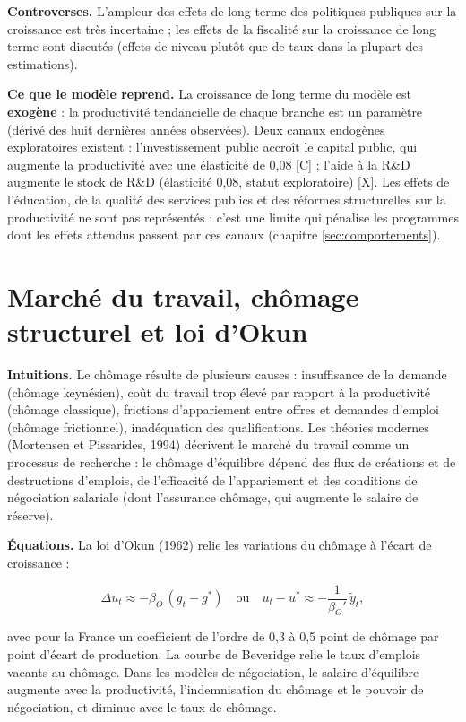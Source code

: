 \documentclass[
  11pt,
  11pt,
  a4paper,
  openany]{book}
\begin{document}
\textbf{Controverses.} L'ampleur des effets de long terme des politiques
publiques sur la croissance est très incertaine ; les effets de la
fiscalité sur la croissance de long terme sont discutés (effets de
niveau plutôt que de taux dans la plupart des estimations).

\textbf{Ce que le modèle reprend.} La croissance de long terme du modèle
est \textbf{exogène} : la productivité tendancielle de chaque branche
est un paramètre (dérivé des huit dernières années observées). Deux
canaux endogènes exploratoires existent : l'investissement public
accroît le capital public, qui augmente la productivité avec une
élasticité de 0,08 {[}C{]} ; l'aide à la R\&D augmente le stock de R\&D
(élasticité 0,08, statut exploratoire) {[}X{]}. Les effets de
l'éducation, de la qualité des services publics et des réformes
structurelles sur la productivité ne sont pas représentés : c'est une
limite qui pénalise les programmes dont les effets attendus passent par
ces canaux (chapitre \ref{sec:comportements}).

\hypertarget{sec:travail}{%
\section{Marché du travail, chômage structurel et loi
d'Okun}\label{sec:travail}}

\textbf{Intuitions.} Le chômage résulte de plusieurs causes :
insuffisance de la demande (chômage keynésien), coût du travail trop
élevé par rapport à la productivité (chômage classique), frictions
d'appariement entre offres et demandes d'emploi (chômage frictionnel),
inadéquation des qualifications. Les théories modernes (Mortensen et
Pissarides, 1994) décrivent le marché du travail comme un processus de
recherche : le chômage d'équilibre dépend des flux de créations et de
destructions d'emplois, de l'efficacité de l'appariement et des
conditions de négociation salariale (dont l'assurance chômage, qui
augmente le salaire de réserve).

\textbf{Équations.} La loi d'Okun (1962) relie les variations du chômage
à l'écart de croissance :

\[\Delta u_t \approx -\beta_O\,(g_t - g^*) \quad\text{ou}\quad u_t - u^* \approx -\frac{1}{\beta_O'}\,\tilde y_t,\]

avec pour la France un coefficient de l'ordre de 0,3 à 0,5 point de
chômage par point d'écart de production. La courbe de Beveridge relie le
taux d'emplois vacants au chômage. Dans les modèles de négociation, le
salaire d'équilibre augmente avec la productivité, l'indemnisation du
chômage et le pouvoir de négociation, et diminue avec le taux de
chômage.
\end{document}

